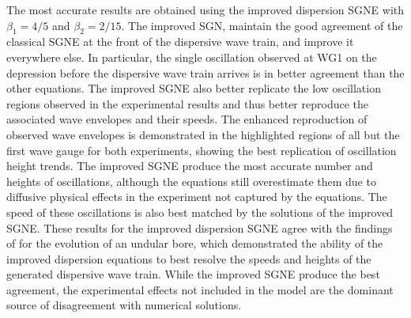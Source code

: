 \documentclass[10pt]{elsarticle}
\begin{document}
The most accurate results are obtained using the improved dispersion SGNE with $\beta_1 = 4/5$ and $\beta_2 = 2/15$. The improved SGN, maintain the good agreement of the classical SGNE at the front of the dispersive wave train, and improve it everywhere else. In particular, the single oscillation observed at WG1 on the depression before the dispersive wave train arrives is in better agreement than the other equations. The improved SGNE also better replicate the low oscillation regions observed in the experimental results and thus better reproduce the associated wave envelopes and their speeds. The enhanced reproduction of observed wave envelopes is demonstrated in the highlighted regions of all but the first wave gauge for both experiments, showing the best replication of oscillation height trends. The improved SGNE produce the most accurate number and heights of oscillations, although the equations still overestimate them due to diffusive physical effects in the experiment not captured by the equations. The speed of these oscillations is also best matched by the solutions of the improved SGNE. These results for the improved dispersion SGNE agree with the findings of \citet{DoCarmo-2018} for the evolution of an undular bore, which demonstrated the ability of the improved dispersion equations to best resolve the speeds and heights of the generated dispersive wave train. While the improved SGNE produce the best agreement, the experimental effects not included in the model are the dominant source of disagreement with numerical solutions.
\end{document}
